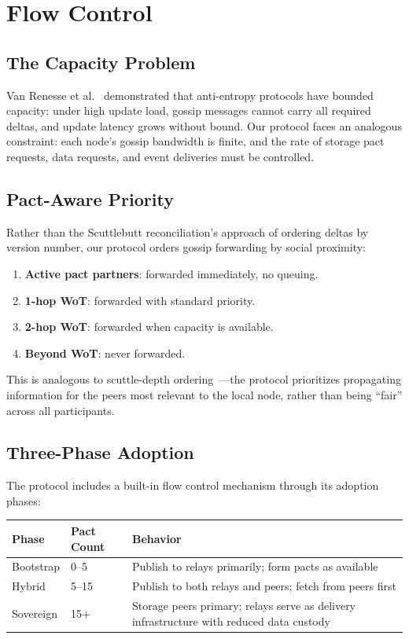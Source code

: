 \documentclass[11pt,a4paper]{article}
\begin{document}
\section{Flow Control}
\label{sec:flowcontrol}

\subsection{The Capacity Problem}

Van Renesse et al.~\cite{vanrenesse} demonstrated that anti-entropy protocols have bounded capacity: under high update load, gossip messages cannot carry all required deltas, and update latency grows without bound. Our protocol faces an analogous constraint: each node's gossip bandwidth is finite, and the rate of storage pact requests, data requests, and event deliveries must be controlled.

\subsection{Pact-Aware Priority}

Rather than the Scuttlebutt reconciliation's approach of ordering deltas by version number, our protocol orders gossip forwarding by social proximity:

\begin{enumerate}
  \item \textbf{Active pact partners}: forwarded immediately, no queuing.
  \item \textbf{1-hop WoT}: forwarded with standard priority.
  \item \textbf{2-hop WoT}: forwarded when capacity is available.
  \item \textbf{Beyond WoT}: never forwarded.
\end{enumerate}

This is analogous to scuttle-depth ordering~\cite{vanrenesse}---the protocol prioritizes propagating information for the peers most relevant to the local node, rather than being ``fair'' across all participants.

\subsection{Three-Phase Adoption}

The protocol includes a built-in flow control mechanism through its adoption phases:

\begin{table}[h]
\centering
\begin{tabular}{lll}
\toprule
\textbf{Phase} & \textbf{Pact Count} & \textbf{Behavior} \\
\midrule
Bootstrap & 0--5 & Publish to relays primarily; form pacts as available \\
Hybrid & 5--15 & Publish to both relays and peers; fetch from peers first \\
Sovereign & 15+ & Storage peers primary; relays serve as delivery infrastructure with reduced data custody \\
\bottomrule
\end{tabular}
\end{table}
\end{document}

